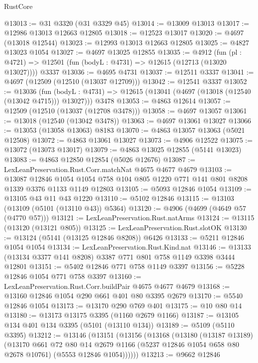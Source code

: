 \begin{lexlean}{RustCore}
\begin{coremodule}
@13013 := @31 @3320 (@31 @3329 @45)
@13014 := @13009 @13013
@13017 := @12986 @13013 @12663 @12805
@13018 := @12523 @13017
@13020 := @4697 (@13018 @12544)
@13023 := @12993 @13013 @12663 @12805
@13025 := @4827 @13023 @1054
@13027 := @4697 @13025 @12855
@13035 := @4912
    (fun (pl : @4721) => @12501 (fun (bodyL : @4731) => @12615 (@12713 (@13020 @13027))))
    @3337
@13036 := @4695 @4731
@13037 := @12511 @3337
@13041 := @4697 (@12509 (@12510 (@13037 @12709)))
@13042 := @12541 @3337
@13052 := @13036
    (fun (bodyL : @4731) => @12615 (@13041 (@4697 (@13018 (@12540 (@13042 @4715))) @13027)))
    @3478
@13053 := @4863 @12614
@13057 := @12509 (@12510 (@13037 (@12708 @3478)))
@13058 := @4697 @13057
@13061 := @13018 (@12540 (@13042 @3478))
@13063 := @4697 @13061 @13027
@13066 := @13053 (@13058 @13063) @8183
@13070 := @4863 @13057 @13063 (@5021 @12508)
@13072 := @4863 @13061 @13027
@13073 := @4906 @12522
@13075 := @13072 (@13073 @13017)
@13079 := @4863 @13025 @12855 (@5141 @13023)
@13083 := @4863 @12850 @12854 (@5026 @12676)
@13087 := LexLeanPreservation.Rust.Corr.matchNat @4675 @4677 @4679
@13103 := @13087
    @12846
    @1054
    @1054
    @758
    @104
    @805
    @1220
    @771
    @141
    @801
    @8208
    @1339
    @3376
    @1133
    @1149
    @12803
@13105 := @5093 @12846 @1054
@13109 := @13105 @43 @11 @43 @1220
@13110 := @5102 @12846
@13115 := @13103 (@13109 (@5101 (@13110 @43)) @5364)
@13120 := @4906 (@4699 (@4649 @57 (@4770 @57)))
@13121 := LexLeanPreservation.Rust.natArms
@13124 := @13115 (@13120 (@13121 @805))
@13125 := LexLeanPreservation.Rust.slotOK
@13130 := @13124 (@5141 (@13125 @12846 @8208)) @6426
@13133 := @5211 @12846 @1054 @1054
@13134 := LexLeanPreservation.Rust.Kind.nat
@13146 := @13133 (@13134 @3377 @141 @8208) @3387 @771 @801 @758 @1149 @3398 @3444 @12801
@13151 := @5402 @12846 @771 @758 @1149 @3397
@13156 := @5228 @12846 @1054 @771 @758 @3397
@13160 := LexLeanPreservation.Rust.Corr.buildPair @4675 @4677 @4679
@13168 := @13160 @12846 @1054 @290 @661 @401 @80 @3395 @2679
@13170 := @5540 @12846 @1054
@13173 := @13170 @290 @769 @401
@13175 := @10 @80 @14
@13180 := @13173 @13175 @3395 (@1160 @2679 @1166)
@13187 := @13105 @134 @401 @134 @3395 (@5101 (@13110 @134))
@13189 := @5109 (@5110 @3395)
@13212 := @13146
    (@13151
      (@13156
        (@13168
          (@13180
            (@13187 @13189)
            (@13170
              @661
              @72
              @80
              @14
              @2679
              @1166
              (@5237 @12846 @1054 @658 @80 @2678 @10761)
              (@5553 @12846 @1054))))))
@13213 := @9662 @12846

\end{coremodule}
\end{lexlean}
